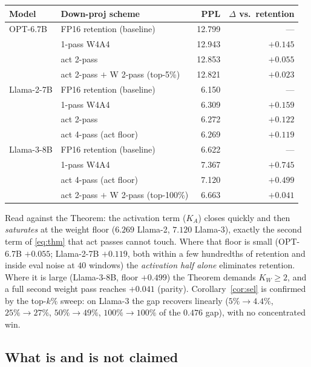 \documentclass[11pt]{article}
\theoremstyle{remark}
\begin{document}
\begin{center}\small
\begin{tabular}{@{}llrr@{}}
\toprule
Model & Down-proj scheme & PPL & $\Delta$ vs.\ retention \\
\midrule
OPT-6.7B     & FP16 retention (baseline)         & 12.799 & --- \\
             & 1-pass W4A4                        & 12.943 & $+0.145$ \\
             & act 2-pass                         & 12.853 & $+0.055$ \\
             & act 2-pass $+$ W 2-pass (top-5\%)  & 12.821 & $+0.023$ \\
\midrule
Llama-2-7B   & FP16 retention (baseline)         & 6.150  & --- \\
             & 1-pass W4A4                        & 6.309  & $+0.159$ \\
             & act 2-pass                         & 6.272  & $+0.122$ \\
             & act 4-pass (act floor)            & 6.269  & $+0.119$ \\
\midrule
Llama-3-8B   & FP16 retention (baseline)         & 6.622  & --- \\
             & 1-pass W4A4                        & 7.367  & $+0.745$ \\
             & act 4-pass (act floor)            & 7.120  & $+0.499$ \\
             & act 2-pass $+$ W 2-pass (top-100\%)& 6.663  & $+0.041$ \\
\bottomrule
\end{tabular}
\end{center}

Read against the Theorem: the activation term ($K_A$) closes quickly and then
\emph{saturates} at the weight floor ($6.269$ Llama-2, $7.120$ Llama-3), exactly
the second term of \eqref{eq:thm} that act passes cannot touch. Where that floor
is small (OPT-6.7B $+0.055$; Llama-2-7B $+0.119$, both within a few hundredths of
retention and inside eval noise at $40$ windows) the \emph{activation half alone}
eliminates retention. Where it is large (Llama-3-8B, floor $+0.499$) the Theorem
demands $K_W\!\ge\!2$, and a full second weight pass reaches $+0.041$ (parity).
Corollary~\ref{cor:sel} is confirmed by the top-$k\%$ sweep: on Llama-3 the gap
recovers linearly ($5\%\!\to\!4.4\%$, $25\%\!\to\!27\%$, $50\%\!\to\!49\%$,
$100\%\!\to\!100\%$ of the $0.476$ gap), with no concentrated win.

\subsection{What is and is not claimed}
\end{document}
